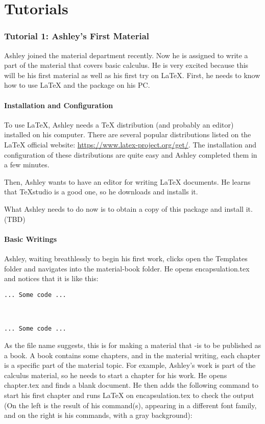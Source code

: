 \part{Tutorials}
\section{Tutorial 1: Ashley's First Material}
Ashley joined the material department recently. Now he is assigned to write a part of the material that covers basic calculus. He is very excited because this will be his first material as well as his first try on \LaTeX. First, he needs to know how to use \LaTeX{} and the package on his PC.

\subsection{Installation and Configuration}
To use \LaTeX{}, Ashley needs a \TeX{} distribution (and probably an editor) installed on his computer. There are several popular distributions listed on the \LaTeX{} official website: \url{https://www.latex-project.org/get/}. The installation and configuration of these distributions are quite easy and Ashley completed them in a few minutes.

Then, Ashley wants to have an editor for writing \LaTeX{} documents. He learns that \TeX studio is a good one, so he downloads and installs it.

What Ashley needs to do now is to obtain a copy of this package and install it. (TBD)

\subsection{Basic Writings}
Ashley, waiting breathlessly to begin his first work, clicks open the Templates folder and navigates into the material-book folder. He opens encapsulation.tex and notices that it is like this:
\begin{lstlisting}
... Some code ...



... Some code ...
\end{lstlisting}

As the file name suggests, this is for making a material that -is to be published as a book. A book contains some chapters, and in the material writing, each chapter is a specific part of the material topic. For example, Ashley's work is part of the calculus material, so he needs to start a chapter for his work. He opens chapter.tex and finds a blank document. He then adds the following command to start his first chapter and runs \LaTeX{} on encapsulation.tex to check the output (On the left is the result of his command(s), appearing in a different font family, and on the right is his commands, with a gray background):

